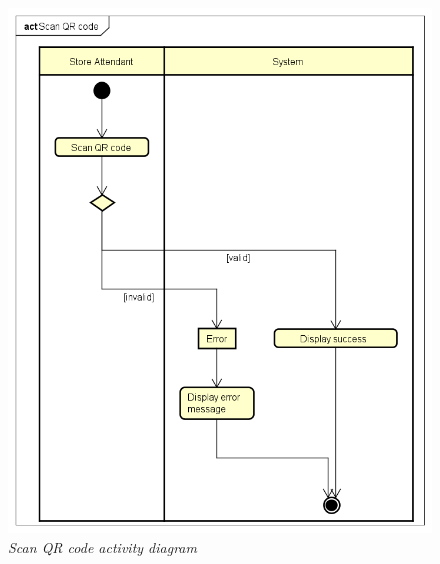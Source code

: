 \documentclass[table, 12pt]{article}
\begin{document}
\begin{figure}[H]
    \centering
    \includegraphics[scale=0.4]{assets/Activity-Diagrams/act_scan.png}
    \caption{\textit{Scan QR code activity diagram}}
\end{figure}
\end{document}
